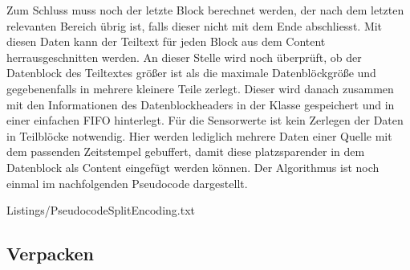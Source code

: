 Zum Schluss muss noch der letzte Block berechnet werden, der nach dem letzten
relevanten Bereich {\"u}brig ist, falls dieser nicht mit dem Ende abschliesst. Mit
diesen Daten kann der Teiltext f{\"u}r jeden Block aus dem Content
herrausgeschnitten werden. An dieser Stelle wird noch {\"u}berpr{\"u}ft, ob der
Datenblock des Teiltextes gr{\"o}{\ss}er ist als die maximale Datenbl{\"o}ckgr{\"o}{\ss}e und
gegebenenfalls in mehrere kleinere Teile zerlegt. Dieser wird danach zusammen
mit den Informationen des Datenblockheaders in der Klasse 
gespeichert und in einer einfachen FIFO hinterlegt. F{\"u}r die Sensorwerte
ist kein Zerlegen der Daten in Teilbl{\"o}cke notwendig.
Hier werden lediglich mehrere Daten einer Quelle mit dem passenden
Zeitstempel gebuffert, damit diese platzsparender in dem Datenblock als
Content eingef{\"u}gt werden k{\"o}nnen. \newline
Der Algorithmus ist noch einmal im nachfolgenden Pseudocode dargestellt.

\lstset{language=pseudo}
\lstset{commentstyle=\textit}
 {Listings/PseudocodeSplitEncoding.txt}

\subsection{Verpacken}


